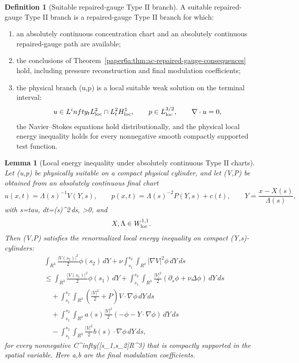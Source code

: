 \documentclass[11pt]{amsart}
\def\({}%
\def\){}%
\def\mathbb#1{#1}%
\def\tau{tau}%
\def\infty{infty}%
\theoremstyle{plain}
\newtheorem{lemma}[lemma]{Lemma}
\theoremstyle{definition}
\newtheorem{definition}[definition]{Definition}
\theoremstyle{remark}
\begin{document}
\begin{definition}[Suitable repaired-gauge Type II branch]
\label{paper6a:def:suitable-repaired-gauge-typeII-branch}
A suitable repaired-gauge Type II branch is a repaired-gauge Type II branch for
which:
\begin{enumerate}[label=\textup{(\roman*)}]
\item an absolutely continuous concentration chart and an absolutely continuous
repaired-gauge path are available;
\item the conclusions of
Theorem~\ref{paper6a:thm:ac-repaired-gauge-consequences} hold, including
pressure reconstruction and final modulation coefficients;
\item the physical branch \((u,p)\) is a local suitable weak solution on the
terminal interval:
\[
  u\in L^\infty_tL^2_{\rm loc}\cap L^2_tH^1_{\rm loc},
  \qquad
  p\in L^{3/2}_{\rm loc},
  \qquad
  \nabla\cdot u=0,
\]
the Navier--Stokes equations hold distributionally, and the physical local
energy inequality holds for every nonnegative smooth compactly supported test
function.
\end{enumerate}
\end{definition}

\begin{lemma}[Local energy inequality under absolutely continuous Type II charts]
\label{paper6a:lem:ac-pullback-local-energy}
Let \((u,p)\) be physically suitable on a compact physical cylinder, and let
\((V,P)\) be obtained from an absolutely continuous final chart
\[
  u(x,t)=\Lambda(s)^{-1}V(Y,s),
  \qquad
  p(x,t)=\Lambda(s)^{-2}P(Y,s)+c(t),
  \qquad
  Y=\frac{x-X(s)}{\Lambda(s)},
\]
with \(s=\tau\), \(dt=\Lambda(s)^2\,ds\), \(\Lambda>0\), and
\[
  X,\Lambda\in W^{1,1}_{\rm loc}.
\]
Then \((V,P)\) satisfies the renormalized local energy inequality on compact
\((Y,s)\)-cylinders:
\[
\begin{aligned}
&\int_{\mathbb R^3} \frac{|V(s_2)|^2}{2}\phi(s_2)\,dY
+\nu\int_{s_1}^{s_2}\int_{\mathbb R^3} |\nabla V|^2\phi\,dY\,ds \\
&\le
\int_{\mathbb R^3} \frac{|V(s_1)|^2}{2}\phi(s_1)\,dY
+\int_{s_1}^{s_2}\int_{\mathbb R^3}
\frac{|V|^2}{2}(\partial_s\phi+\nu\Delta\phi)\,dY\,ds \\
&\quad
+\int_{s_1}^{s_2}\int_{\mathbb R^3}
\left(\frac{|V|^2}{2}+P\right)V\cdot\nabla\phi\,dY\,ds \\
&\quad
+\int_{s_1}^{s_2}\int_{\mathbb R^3}
 a(s)\frac{|V|^2}{2}(-\phi-Y\cdot\nabla\phi)\,dY\,ds\\
&\quad
-\int_{s_1}^{s_2}\int_{\mathbb R^3}
 \frac{|V|^2}{2}b(s)\cdot\nabla\phi\,dY\,ds,
\end{aligned}
\]
for every nonnegative
\(\phi\in C^\infty([s_1,s_2]\times\mathbb R^3)\) that is compactly supported
in the spatial variable.  Here \(a,b\) are the final modulation coefficients.
\end{lemma}
\end{document}

